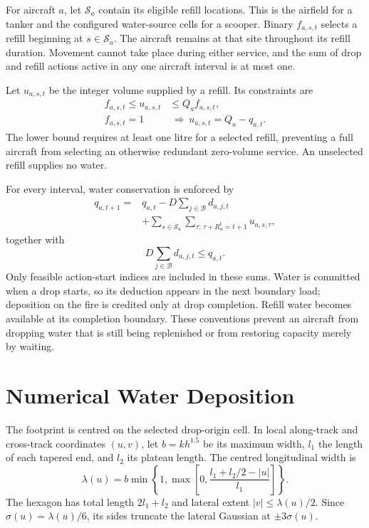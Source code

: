 For aircraft $a$, let $\mathcal{S}_a$ contain its eligible refill locations. This is the airfield for a tanker and the configured water-source cells for a scooper. Binary $f_{a,s,t}$ selects a refill beginning at $s\in\mathcal{S}_a$. The aircraft remains at that site throughout its refill duration. Movement cannot take place during either service, and the sum of drop and refill actions active in any one aircraft interval is at most one.

Let $u_{a,s,t}$ be the integer volume supplied by a refill. Its constraints are
\begin{align}
    f_{a,s,t}\leq u_{a,s,t}&\leq Q_a f_{a,s,t},\\
    f_{a,s,t}=1&\ \Longrightarrow\
    u_{a,s,t}=Q_a-q_{a,t}.
\end{align}
The lower bound requires at least one litre for a selected refill, preventing a full aircraft from selecting an otherwise redundant zero-volume service. An unselected refill supplies no water.

For every interval, water conservation is enforced by
\begin{equation}
\begin{split}
    q_{a,t+1}={}&q_{a,t}-D\sum_{j\in\mathcal{B}}d_{a,j,t}\\
    &+\sum_{s\in\mathcal{S}_a}
    \sum_{\tau:\,\tau+R_a^{\mathrm{f}}=t+1}u_{a,s,\tau},
\end{split}
\label{eq:static-water-balance}
\end{equation}
together with
\begin{equation}
    D\sum_{j\in\mathcal{B}}d_{a,j,t}\leq q_{a,t}.
\end{equation}
Only feasible action-start indices are included in these sums. Water is committed when a drop starts, so its deduction appears in the next boundary load; deposition on the fire is credited only at drop completion. Refill water becomes available at its completion boundary. These conventions prevent an aircraft from dropping water that is still being replenished or from restoring capacity merely by waiting.

\section{Numerical Water Deposition}
\label{sec:method-deposition}

The footprint is centred on the selected drop-origin cell. In local along-track and cross-track coordinates $(u,v)$, let $b=kh^{1.5}$ be its maximum width, $l_1$ the length of each tapered end, and $l_2$ its plateau length. The centred longitudinal width is
\begin{equation}
    \lambda(u)=b\min\!\left\{1,
        \max\!\left[0,\frac{l_1+l_2/2-|u|}{l_1}\right]\right\}.
\end{equation}
The hexagon has total length $2l_1+l_2$ and lateral extent $|v|\leq\lambda(u)/2$. Since $\sigma(u)=\lambda(u)/6$, its sides truncate the lateral Gaussian at $\pm3\sigma(u)$.

